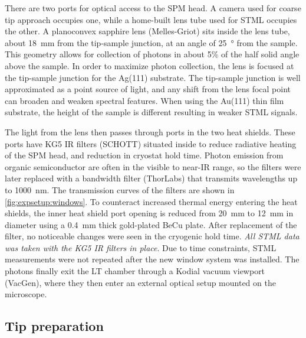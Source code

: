 There are two ports for optical access to the \ac{SPM} head. A camera used for coarse tip approach occupies one, while a home-built lens tube used for \ac{STML} occupies the other. A planoconvex sapphire lens (Melles-Griot) sits inside the lens tube, about \SI{18}{mm} from the tip-sample junction, at an angle of \SI{25}{\degree} from the sample. This geometry allows for collection of photons in about 5\% of the half solid angle above the sample. In order to maximize photon collection, the lens is focused at the tip-sample junction for the Ag(111) substrate. The tip-sample junction is well approximated as a point source of light, and any shift from the lens focal point can broaden and weaken spectral features. When using the Au(111) thin film substrate, the height of the sample is different resulting in weaker \ac{STML} signals.

The light from the lens then passes through ports in the two heat shields. These ports have KG5 \ac{IR} filters (SCHOTT) situated inside to reduce radiative heating of the \ac{SPM} head, and reduction in cryostat hold time. Photon emission from organic semiconductor are often in the visible to near-\ac{IR} range, so the filters were later replaced with a bandwidth filter (ThorLabs) that transmits wavelengths up to \SI{1000}{nm}. The transmission curves of the filters are shown in \autoref{fig:expsetup:windows}. To counteract increased thermal energy entering the heat shields, the inner heat shield port opening is reduced from \SI{20}{mm} to \SI{12}{mm} in diameter using a \SI{0.4}{mm} thick gold-plated BeCu plate. After replacement of the filter, no noticeable changes were seen in the cryogenic hold time. \emph{All \ac{STML} data was taken with the KG5 \ac{IR} filters in place}. Due to time constraints, \ac{STML} measurements were not repeated after the new window system was installed. The photons finally exit the \ac{LT} chamber through a Kodial vacuum viewport (VacGen), where they then enter an external optical setup mounted on the microscope. 

\begin{figure} [h]
    \centering
    \caption{}
    \label{fig:expsetup:windows}
\end{figure}


\subsection{Tip preparation}

